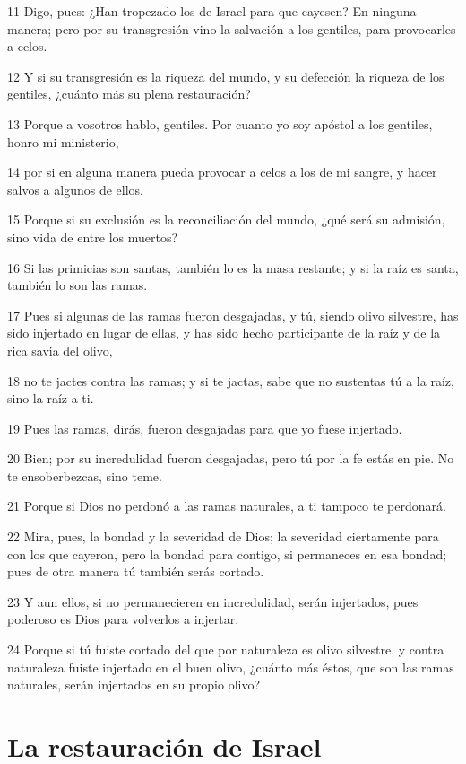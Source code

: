 \par 11 Digo, pues: ¿Han tropezado los de Israel para que cayesen? En ninguna manera; pero por su transgresión vino la salvación a los gentiles, para provocarles a celos.
\par 12 Y si su transgresión es la riqueza del mundo, y su defección la riqueza de los gentiles, ¿cuánto más su plena restauración?
\par 13 Porque a vosotros hablo, gentiles. Por cuanto yo soy apóstol a los gentiles, honro mi ministerio,
\par 14 por si en alguna manera pueda provocar a celos a los de mi sangre, y hacer salvos a algunos de ellos.
\par 15 Porque si su exclusión es la reconciliación del mundo, ¿qué será su admisión, sino vida de entre los muertos?
\par 16 Si las primicias son santas, también lo es la masa restante; y si la raíz es santa, también lo son las ramas.
\par 17 Pues si algunas de las ramas fueron desgajadas, y tú, siendo olivo silvestre, has sido injertado en lugar de ellas, y has sido hecho participante de la raíz y de la rica savia del olivo,
\par 18 no te jactes contra las ramas; y si te jactas, sabe que no sustentas tú a la raíz, sino la raíz a ti.
\par 19 Pues las ramas, dirás, fueron desgajadas para que yo fuese injertado.
\par 20 Bien; por su incredulidad fueron desgajadas, pero tú por la fe estás en pie. No te ensoberbezcas, sino teme.
\par 21 Porque si Dios no perdonó a las ramas naturales, a ti tampoco te perdonará.
\par 22 Mira, pues, la bondad y la severidad de Dios; la severidad ciertamente para con los que cayeron, pero la bondad para contigo, si permaneces en esa bondad; pues de otra manera tú también serás cortado.
\par 23 Y aun ellos, si no permanecieren en incredulidad, serán injertados, pues poderoso es Dios para volverlos a injertar.
\par 24 Porque si tú fuiste cortado del que por naturaleza es olivo silvestre, y contra naturaleza fuiste injertado en el buen olivo, ¿cuánto más éstos, que son las ramas naturales, serán injertados en su propio olivo?

\section*{La restauración de Israel}

